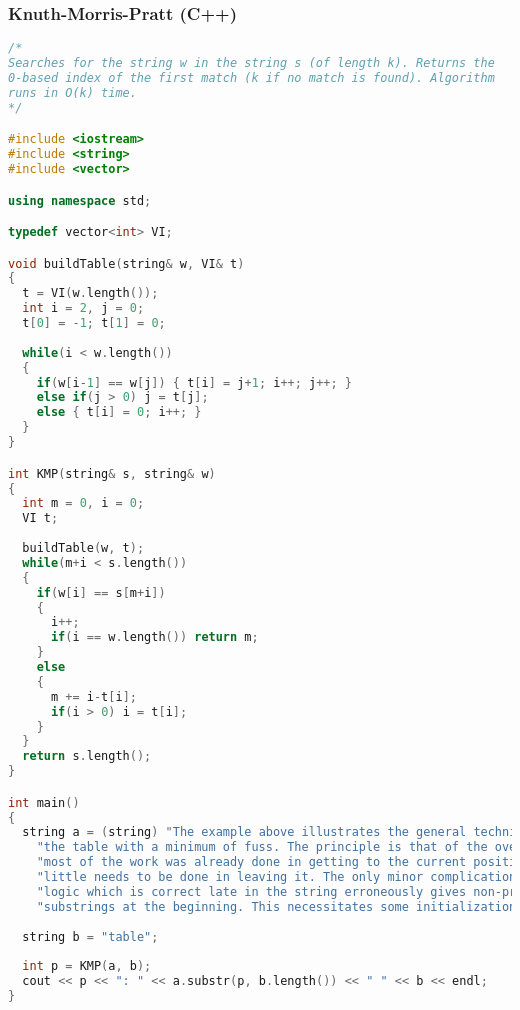 \subsubsection{Knuth-Morris-Pratt (C++)}
\begin{lstlisting}[language=C++]
/*
Searches for the string w in the string s (of length k). Returns the
0-based index of the first match (k if no match is found). Algorithm
runs in O(k) time.
*/

#include <iostream>
#include <string>
#include <vector>

using namespace std;

typedef vector<int> VI;

void buildTable(string& w, VI& t)
{
  t = VI(w.length());  
  int i = 2, j = 0;
  t[0] = -1; t[1] = 0;
  
  while(i < w.length())
  {
    if(w[i-1] == w[j]) { t[i] = j+1; i++; j++; }
    else if(j > 0) j = t[j];
    else { t[i] = 0; i++; }
  }
}

int KMP(string& s, string& w)
{
  int m = 0, i = 0;
  VI t;
  
  buildTable(w, t);  
  while(m+i < s.length())
  {
    if(w[i] == s[m+i])
    {
      i++;
      if(i == w.length()) return m;
    }
    else
    {
      m += i-t[i];
      if(i > 0) i = t[i];
    }
  }  
  return s.length();
}

int main()
{
  string a = (string) "The example above illustrates the general technique for assembling "+
    "the table with a minimum of fuss. The principle is that of the overall search: "+
    "most of the work was already done in getting to the current position, so very "+
    "little needs to be done in leaving it. The only minor complication is that the "+
    "logic which is correct late in the string erroneously gives non-proper "+
    "substrings at the beginning. This necessitates some initialization code.";
  
  string b = "table";
  
  int p = KMP(a, b);
  cout << p << ": " << a.substr(p, b.length()) << " " << b << endl;
}

\end{lstlisting}

